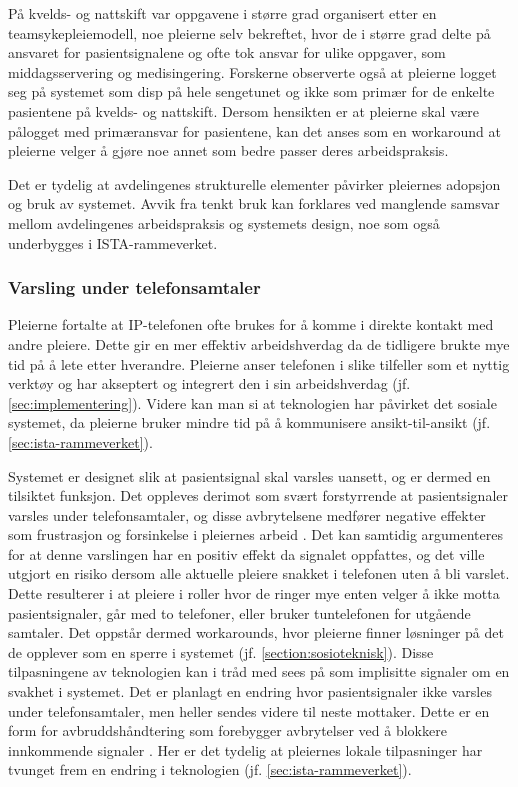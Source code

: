 \noindent
På kvelds- og nattskift var oppgavene i større grad organisert etter en teamsykepleiemodell, noe pleierne selv bekreftet, hvor de i større grad delte på ansvaret for pasientsignalene og ofte tok ansvar for ulike oppgaver, som middagsservering og medisingering. Forskerne observerte også at pleierne logget seg på systemet som disp på hele sengetunet og ikke som primær for de enkelte pasientene på kvelds- og nattskift. Dersom hensikten er at pleierne skal være pålogget med primæransvar for pasientene, kan det anses som en workaround at pleierne velger å gjøre noe annet som bedre passer deres arbeidspraksis.

\noindent
Det er tydelig at avdelingenes strukturelle elementer påvirker pleiernes adopsjon og bruk av systemet. Avvik fra tenkt bruk kan forklares ved manglende samsvar mellom avdelingenes arbeidspraksis og systemets design, noe som også underbygges i ISTA-rammeverket. 

\subsubsection{Varsling under telefonsamtaler}
Pleierne fortalte at IP-telefonen ofte brukes for å komme i direkte kontakt med andre pleiere. Dette gir en mer effektiv arbeidshverdag da de tidligere brukte mye tid på å lete etter hverandre. Pleierne anser telefonen i slike tilfeller som et nyttig verktøy og har akseptert og integrert den i sin arbeidshverdag (jf. \ref{sec:implementering}). Videre kan man si at teknologien har påvirket det sosiale systemet, da pleierne bruker mindre tid på å kommunisere ansikt-til-ansikt (jf. \ref{sec:ista-rammeverket}). 

\noindent
Systemet er designet slik at pasientsignal skal varsles uansett, og er dermed en tilsiktet funksjon. Det oppleves derimot som svært forstyrrende at pasientsignaler varsles under telefonsamtaler, og disse avbrytelsene medfører negative effekter som frustrasjon og forsinkelse i pleiernes arbeid \citep{Grundgeiger09}. Det kan samtidig argumenteres for at denne varslingen har en positiv effekt da signalet oppfattes, og det ville utgjort en risiko dersom alle aktuelle pleiere snakket i telefonen uten å bli varslet. Dette resulterer i at pleiere i roller hvor de ringer mye enten velger å ikke motta pasientsignaler, går med to telefoner, eller bruker tuntelefonen for utgående samtaler. Det oppstår dermed workarounds, hvor pleierne finner løsninger på det de opplever som en sperre i systemet (jf. \ref{section:sosioteknisk}). Disse tilpasningene av teknologien kan i tråd med \citet{Coiera07} sees på som implisitte signaler om en svakhet i systemet. Det er planlagt en endring hvor pasientsignaler ikke varsles under telefonsamtaler, men heller sendes videre til neste mottaker. Dette er en form for avbruddshåndtering som forebygger avbrytelser ved å blokkere innkommende signaler \citep{Grandhi10}. Her er det tydelig at pleiernes lokale tilpasninger har tvunget frem en endring i teknologien (jf. \ref{sec:ista-rammeverket}).
	
